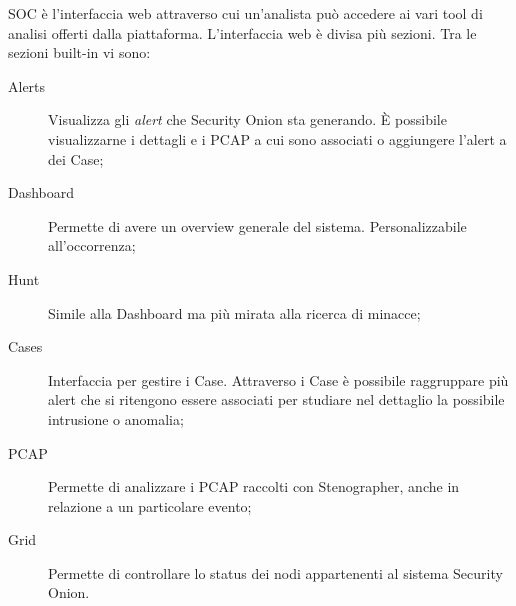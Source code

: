 SOC è l'interfaccia web attraverso cui un'analista può accedere ai vari tool di analisi offerti dalla piattaforma.
L'interfaccia web è divisa più sezioni.
Tra le sezioni built-in vi sono:
\begin{description}
    \item[Alerts] Visualizza gli \textit{alert} che Security Onion sta generando. È possibile visualizzarne i dettagli e i PCAP a cui sono associati o aggiungere l'alert a dei Case;
    \item[Dashboard] Permette di avere un overview generale del sistema. Personalizzabile all'occorrenza;
    \item[Hunt] Simile alla Dashboard ma più mirata alla ricerca di minacce;
    \item[Cases] Interfaccia per gestire i Case. Attraverso i Case è possibile raggruppare più alert che si ritengono essere associati per studiare nel dettaglio la possibile intrusione o anomalia;
    \item[PCAP] Permette di analizzare i PCAP raccolti con Stenographer, anche in relazione a un particolare evento;
    \item[Grid] Permette di controllare lo status dei nodi appartenenti al sistema Security Onion.
\end{description}

